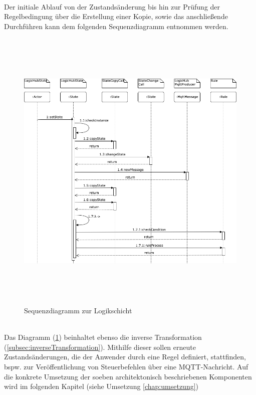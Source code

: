     \\
    Der initiale Ablauf von der Zustandsänderung bis hin zur Prüfung der Regelbedingung über die Erstellung einer Kopie, sowie das anschließende Durchführen kann dem folgenden Sequenzdiagramm entnommen werden. 
    \\
    \pagebreak
    \begin{figure}[hbt!]
        \centering
        \includegraphics[width=14cm,height=14cm,keepaspectratio]{images/Logikschicht_Sequenz_final.png}
        \caption{Sequenzdiagramm zur Logikschicht}
        \label{fig:logiksequenz}
    \end{figure}
    \\
    Das Diagramm (\ref{fig:logiksequenz}) beinhaltet ebenso die inverse Transformation (\ref{subsec:inverseTransformation}). Mithilfe dieser sollen erneute 
    Zustandsänderungen, die der Anwender durch eine Regel definiert, stattfinden, bspw. zur Veröffentlichung von Steuerbefehlen über eine \acs{MQTT}-Nachricht. %
    Auf die konkrete Umsetzung der soeben architektonisch beschriebenen Komponenten wird im folgenden Kapitel (siehe Umsetzung \ref{chap:umsetzung}) 
